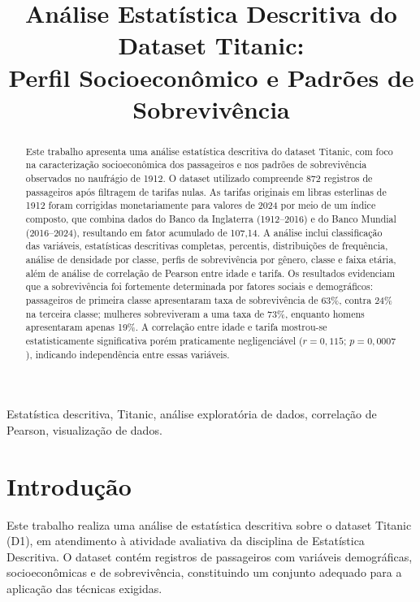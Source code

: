\documentclass[conference]{IEEEtran}
\title{Análise Estatística Descritiva do Dataset Titanic:\\
Perfil Socioeconômico e Padrões de Sobrevivência}
\author{
  \IEEEauthorblockN{Heitor Teixeira}
  \IEEEauthorblockA{
    \textit{MBA: Ciência de dados}\\
    UNIFOR\\
    Fortaleza, Brasil\\
    heitor.mba.unifor@gmail.com
  }
}
\begin{document}
\maketitle

\begin{abstract}
Este trabalho apresenta uma análise estatística descritiva do dataset
Titanic, com foco na caracterização socioeconômica dos passageiros e nos
padrões de sobrevivência observados no naufrágio de 1912. O dataset
utilizado compreende 872 registros de passageiros após filtragem de tarifas
nulas. As tarifas originais em libras esterlinas de 1912 foram corrigidas
monetariamente para valores de 2024 por meio de um índice composto, que
combina dados do Banco da Inglaterra (1912--2016) e do Banco Mundial
(2016--2024), resultando em fator acumulado de 107,14. A análise inclui
classificação das variáveis, estatísticas descritivas completas, percentis,
distribuições de frequência, análise de densidade por classe, perfis de
sobrevivência por gênero, classe e faixa etária, além de análise de
correlação de Pearson entre idade e tarifa. Os resultados evidenciam que a
sobrevivência foi fortemente determinada por fatores sociais e demográficos:
passageiros de primeira classe apresentaram taxa de sobrevivência de 63\%,
contra 24\% na terceira classe; mulheres sobreviveram a uma taxa de 73\%,
enquanto homens apresentaram apenas 19\%. A correlação entre idade e tarifa
mostrou-se estatisticamente significativa porém praticamente negligenciável
($r = 0{,}115$; $p = 0{,}0007$), indicando independência entre essas
variáveis.
\end{abstract}

\begin{IEEEkeywords}
Estatística descritiva, Titanic, análise exploratória de dados,
correlação de Pearson, visualização de dados.
\end{IEEEkeywords}

\section{Introdução}

Este trabalho realiza uma análise de estatística descritiva sobre o dataset
Titanic (D1), em atendimento à atividade avaliativa da disciplina de
Estatística Descritiva. O dataset contém registros de passageiros com
variáveis demográficas, socioeconômicas e de sobrevivência, constituindo
um conjunto adequado para a aplicação das técnicas exigidas.
\end{document}
